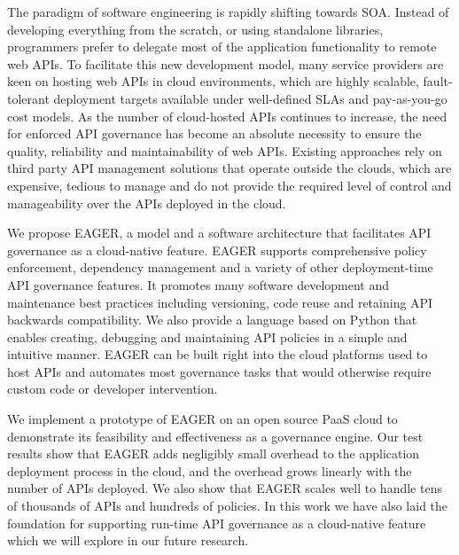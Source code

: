 The paradigm of software engineering is rapidly shifting towards SOA. Instead of developing everything from the scratch, or using standalone
libraries, programmers prefer to delegate most of the application functionality to remote web APIs. To facilitate this new development model,
many service providers are keen on hosting web APIs in cloud environments, which are highly scalable, fault-tolerant deployment targets available under
well-defined SLAs and pay-as-you-go cost models. As the number of cloud-hosted APIs continues to increase, the need for enforced API governance
has become an absolute necessity to ensure the quality, reliability and maintainability of web APIs. Existing approaches rely on third party
API management solutions that operate outside the clouds, which are expensive, tedious to manage and do not provide the required level of
control and manageability over the APIs deployed in the cloud.

We propose EAGER, a model and a software architecture that facilitates API governance as a cloud-native feature. EAGER supports comprehensive
policy enforcement, dependency management and a variety of other deployment-time API governance features. It promotes many software development
and maintenance best practices including versioning, code reuse and retaining API backwards compatibility. We also provide a language based on
Python that enables creating, debugging and maintaining API policies in a simple and intuitive manner. EAGER can be built right into the cloud platforms
used to host APIs and automates most governance tasks that would otherwise require custom code or developer intervention.

We implement a prototype of EAGER on an open source PaaS cloud to demonstrate its feasibility and effectiveness as a governance engine. Our
test results show that EAGER adds negligibly small overhead to the application deployment process in the cloud, and the overhead grows linearly
with the number of APIs deployed. We also show that EAGER scales well to handle tens of thousands of APIs and hundreds of policies. In this work
we have also laid the foundation for supporting run-time API governance as a cloud-native feature which we will explore in our future research.